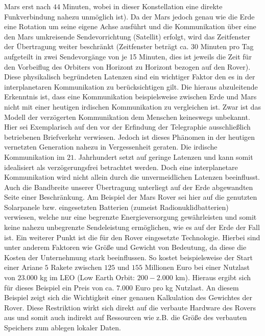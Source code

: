 Mars erst nach $44$ Minuten, wobei in dieser Konstellation eine direkte
Funkverbindung nahezu unm{\"o}glich ist).
Da der Mars jedoch genau wie die Erde eine Rotation um seine eigene Achse
ausf{\"u}hrt und die Kommunikation {\"u}ber eine den Mars
umkreisende Sendevorrichtung (Satellit) erfolgt, wird das Zeitfenster der
{\"U}bertragung weiter beschr{\"a}nkt (Zeitfenster betr{\"a}gt ca. 30 Minuten
pro Tag aufgeteilt in zwei Sendevorg{\"a}nge von je 15 Minuten, dies ist jeweils
die Zeit f{\"u}r den Vorbeiflug des Orbiters von Horizont zu Horizont bezogen
auf den Rover).
Diese physikalisch begr{\"u}ndeten Latenzen sind ein wichtiger Faktor den es in
der interplanetaren Kommunikation zu ber{\"u}cksichtigen gilt. Die hieraus
abzuleitende Erkenntnis ist, dass eine Kommunikation beispielsweise zwischen
Erde und Mars nicht mit einer heutigen irdischen Kommunikation zu vergleichen
ist. Zwar ist das Modell der verz{\"o}gerten Kommunikation dem Menschen
keineswegs unbekannt.
Hier sei Exemplarisch auf den vor der Erfindung der Telegraphie
ausschlie{\ss}lich betriebenen Briefverkehr verwiesen. Jedoch ist dieses
Ph{\"a}nomen in der heutigen vernetzten Generation nahezu in Vergessenheit
geraten. Die irdische Kommunikation im $21$. Jahrhundert setzt auf geringe
Latenzen und kann somit idealisiert als verz{\"o}gerungsfrei betrachtet werden.
Doch eine interplanetare Kommunikation wird nicht allein durch die
unvermeidlichen Latenzen beeinflusst. Auch die Bandbreite unserer
{\"U}bertragung unterliegt auf der Erde abgewandten Seite
einer Beschr{\"a}nkung. Am Beispiel der Mars Rover sei hier auf die genutzten
Solarpanele bzw. eingesetzten Batterien (zumeist Radionuklidbatterien)
verwiesen, welche nur eine begrenzte Energieversorgung gew{\"a}hrleisten und
somit keine nahezu unbegrenzte Sendeleistung erm{\"o}glichen, wie es auf der
Erde der Fall ist.
Ein weiterer Punkt ist die f{\"u}r den Rover eingesetzte Technologie. Hierbei 
sind unter anderem Faktoren wie Gr{\"o}{\ss}e und Gewicht von Bedeutung, da 
diese die Kosten der Unternehmung stark beeinflussen. So kostet beispielsweise 
der Start einer Ariane $5$ Rakete zwischen $125$ und $155$ Millionen Euro bei 
einer Nutzlast von $23.000$ kg im LEO (Low Earth Orbit: $200-2.000$ km).
Hieraus ergibt sich f{\"u}r dieses Beispiel ein Preis von ca. $7.000$ Euro pro kg 
Nutzlast. An diesem Beispiel zeigt sich die Wichtigkeit einer genauen
Kalkulation des Gewichtes der Rover. Diese Restriktion wirkt sich direkt auf die
verbaute Hardware des Rovers aus und somit auch indirekt auf Ressourcen wie z.B.
die Gr{\"o}{\ss}e des verbauten Speichers zum ablegen lokaler Daten.
